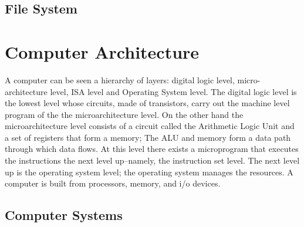 \documentclass{amsbook}
\begin{document}
\section{File System}

\chapter{Computer Architecture}

A computer can be seen a hierarchy of layers: digital logic level, micro-architecture level, ISA level and Operating System level. The digital logic level is the lowest level whose circuits, made of transistors, carry out the machine level program of the the microarchitecture level. On the other hand the microarchitecture level consists of a circuit called the Arithmetic Logic Unit and a set of registers that form a memory; The ALU and memory form a data path through which data flows. At this level there exists a microprogram that executes the instructions the next level up--namely, the instruction set level. The next level up is the operating system level; the operating system manages the resources. A computer is built from processors, memory, and i/o devices.
\section{Computer Systems}
\end{document}
